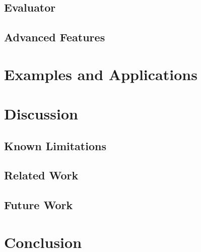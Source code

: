 \documentclass[10pt,letterpaper,twocolumn]{article}
\begin{document}

\subsection{Evaluator}


\subsection{Advanced Features}


\section{Examples and Applications}


\section{Discussion}

\subsection{Known Limitations}


\subsection{Related Work}


\subsection{Future Work}


\section{Conclusion}

\end{document}
